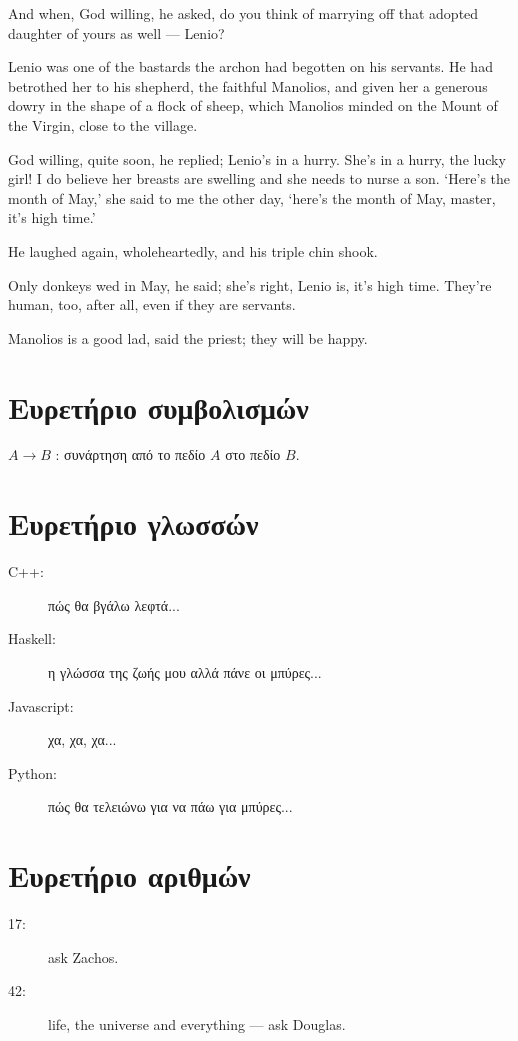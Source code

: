\documentclass[diploma]{softlab-thesis}
\begin{document}
And when, God willing, he asked, do you think of marrying off that adopted
daughter of yours as well --- Lenio?

Lenio was one of the bastards the archon had begotten on his servants. He
had betrothed her to his shepherd, the faithful Manolios, and given her a
generous dowry in the shape of a flock of sheep, which Manolios minded on
the Mount of the Virgin, close to the village.

God willing, quite soon, he replied; Lenio’s in a hurry. She’s in a hurry,
the lucky girl! I do believe her breasts are swelling and she needs to nurse
a son. `Here’s the month of May,' she said to me the other day, `here’s the
month of May, master, it’s high time.'

He laughed again, wholeheartedly, and his triple chin shook.

Only donkeys wed in May, he said; she’s right, Lenio is, it’s high
time. They’re human, too, after all, even if they are servants.

Manolios is a good lad, said the priest; they will be happy.




\nocite{*}






\backmatter

\appendix

\chapter{Ευρετήριο συμβολισμών}

$A \rightarrow B$ : συνάρτηση από το πεδίο $A$ στο πεδίο $B$.

\chapter{Ευρετήριο γλωσσών}

\begin{description}
\item[C++:] πώς θα βγάλω λεφτά...
\item[Haskell:] η γλώσσα της ζωής μου αλλά πάνε οι μπύρες...
\item[Javascript:] χα, χα, χα...
\item[Python:] πώς θα τελειώνω για να πάω για μπύρες...
\end{description}


\chapter{Ευρετήριο αριθμών}

\begin{description}
\item[17:] ask Zachos.
\item[42:] life, the universe and everything --- ask Douglas.
\end{description}


\end{document}
